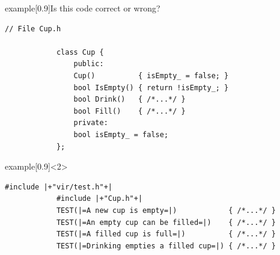 \begin{frame}[fragile]{}
    \begin{varblock}{example}[0.9\textwidth]{Is this code correct or wrong?}
        \begin{lstlisting}[style=MyCpp]
            // File Cup.h

            class Cup {
                public:
                Cup()          { isEmpty_ = false; }
                bool IsEmpty() { return !isEmpty_; }
                bool Drink()   { /*...*/ }
                bool Fill()    { /*...*/ }
                private:
                bool isEmpty_ = false;
            };
        \end{lstlisting}
    \end{varblock}
    \vspace{-2mm}
    \begin{varblock}{example}[0.9\textwidth]{}<2>
        \begin{lstlisting}[style=MyCpp]
            #include |+"vir/test.h"+|
            #include |+"Cup.h"+|
            TEST(|=A new cup is empty=|)            { /*...*/ }
            TEST(|=An empty cup can be filled=|)    { /*...*/ }
            TEST(|=A filled cup is full=|)          { /*...*/ }
            TEST(|=Drinking empties a filled cup=|) { /*...*/ }
        \end{lstlisting}
    \end{varblock}
\end{frame}
